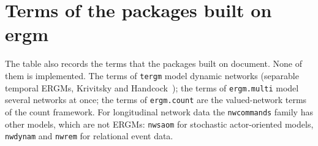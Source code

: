 

\section{Terms of the packages built on ergm}\label{sec:otherpkg}

The table also records the terms that the packages built on \ergm{} document. None of them is implemented. The terms of \texttt{tergm} model dynamic networks (separable temporal ERGMs, Krivitsky and Handcock~\cite{krivitsky2014}); the terms of \texttt{ergm.multi} model several networks at once; the terms of \texttt{ergm.count} are the valued-network terms of the count framework. For longitudinal network data the \texttt{nwcommands} family has other models, which are not ERGMs: \texttt{nwsaom} for stochastic actor-oriented models, \texttt{nwdynam} and \texttt{nwrem} for relational event data.


